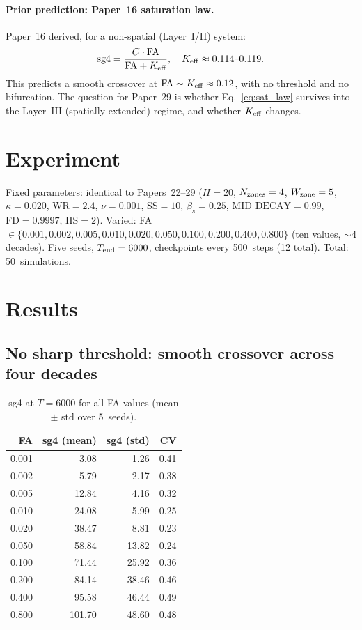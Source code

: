 \documentclass[11pt,a4paper]{article}
\begin{document}
\paragraph{Prior prediction: Paper~16 saturation law.}
Paper~16 derived, for a non-spatial (Layer~I/II) system:
\begin{equation}
  \mathrm{sg4} = \frac{C \cdot \mathrm{FA}}{\mathrm{FA} + K_{\rm eff}},
  \quad K_{\rm eff} \approx 0.114\text{--}0.119.
  \label{eq:sat_law}
\end{equation}
This predicts a smooth crossover at $\mathrm{FA}\sim K_{\rm eff}\approx0.12$,
with no threshold and no bifurcation.
The question for Paper~29 is whether Eq.~\eqref{eq:sat_law} survives into the
Layer~III (spatially extended) regime, and whether $K_{\rm eff}$ changes.

\section{Experiment}

Fixed parameters: identical to Papers~22--29
($H=20$, $N_{\rm zones}=4$, $W_{\rm zone}=5$, $\kappa=0.020$, $\mathrm{WR}=2.4$,
$\nu=0.001$, $\mathrm{SS}=10$, $\beta_s=0.25$, $\mathrm{MID\_DECAY}=0.99$,
$\mathrm{FD}=0.9997$, $\mathrm{HS}=2$).
Varied: FA~$\in\{0.001, 0.002, 0.005, 0.010, 0.020, 0.050, 0.100, 0.200,
0.400, 0.800\}$ (ten values, $\sim4$ decades).
Five seeds, $T_{\rm end}=6000$, checkpoints every 500~steps (12 total).
Total: 50~simulations.

\section{Results}

\subsection{No sharp threshold: smooth crossover across four decades}

\begin{table}[h]
\centering
\small
\caption{sg4 at $T=6000$ for all FA values (mean $\pm$ std over 5~seeds).}
\label{tab:sg4_fa}
\begin{tabular}{rrrr}
\toprule
FA & sg4 (mean) & sg4 (std) & CV \\
\midrule
0.001 &   3.08 &   1.26 & 0.41 \\
0.002 &   5.79 &   2.17 & 0.38 \\
0.005 &  12.84 &   4.16 & 0.32 \\
0.010 &  24.08 &   5.99 & 0.25 \\
0.020 &  38.47 &   8.81 & 0.23 \\
0.050 &  58.84 &  13.82 & 0.24 \\
0.100 &  71.44 &  25.92 & 0.36 \\
0.200 &  84.14 &  38.46 & 0.46 \\
0.400 &  95.58 &  46.44 & 0.49 \\
0.800 & 101.70 &  48.60 & 0.48 \\
\bottomrule
\end{tabular}
\end{table}
\end{document}
